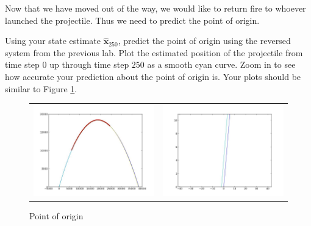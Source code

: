 Now that we have moved out of the way, we would like to return fire to whoever launched the projectile. Thus we need to predict the point of origin.

\begin{problem}
Using your state estimate $\widehat{\mathbf{x}}_{250}$, predict the point of origin using the reversed system from the previous lab. Plot the estimated position of the projectile from time step $0$ up through time step $250$ as a smooth cyan curve. Zoom in to see how accurate your prediction about the point of origin is. Your plots should be similar to Figure \ref{problem5}.
\end{problem}

\begin{figure}\label{problem5}
	\centering
	\begin{tabular}{cc} \includegraphics[width=6cm]{problem5_1.jpg} & \includegraphics[width=6cm]{problem5_2.jpg}
	\end{tabular}
	\caption{Point of origin}
\end{figure}